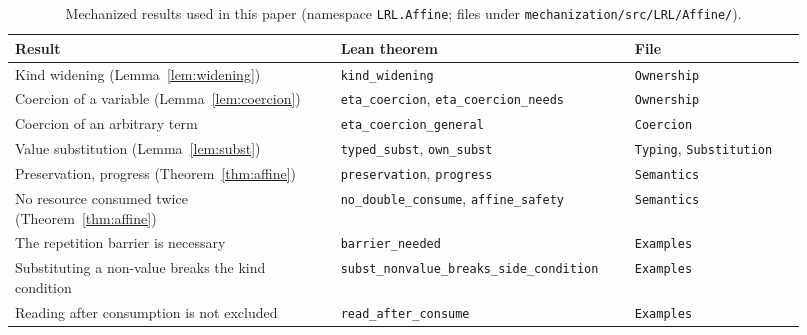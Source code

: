 \begin{table}[h]
\centering\footnotesize
\caption{Mechanized results used in this paper (namespace \texttt{LRL.Affine}; files under \texttt{mechanization/src/LRL/Affine/}).}
\label{tab:mech}
\setlength\tabcolsep{3pt}
\begin{tabular}{p{0.38\linewidth}p{0.34\linewidth}p{0.2\linewidth}}\hline
\textbf{Result} & \textbf{Lean theorem} & \textbf{File}\\\hline\hline
Kind widening (Lemma~\ref{lem:widening}) & \texttt{kind\_widening} & \texttt{Ownership}\\
Coercion of a variable (Lemma~\ref{lem:coercion}) & \texttt{eta\_coercion}, \texttt{eta\_coercion\_needs} & \texttt{Ownership}\\
Coercion of an arbitrary term & \texttt{eta\_coercion\_\allowbreak general} & \texttt{Coercion}\\
Value substitution (Lemma~\ref{lem:subst}) & \texttt{typed\_subst}, \texttt{own\_subst} & \texttt{Typing}, \texttt{Substi\-tution}\\
Preservation, progress (Theorem~\ref{thm:affine}) & \texttt{preservation}, \texttt{progress} & \texttt{Semantics}\\
No resource consumed twice (Theorem~\ref{thm:affine}) & \texttt{no\_double\_consume}, \texttt{affine\_safety} & \texttt{Semantics}\\
The repetition barrier is necessary & \texttt{barrier\_needed} & \texttt{Examples}\\
Substituting a non-value breaks the kind condition & \texttt{subst\_nonvalue\_\allowbreak breaks\_\allowbreak side\_\allowbreak condition} & \texttt{Examples}\\
Reading after consumption is not excluded & \texttt{read\_after\_consume} & \texttt{Examples}\\\hline
\end{tabular}
\end{table}

